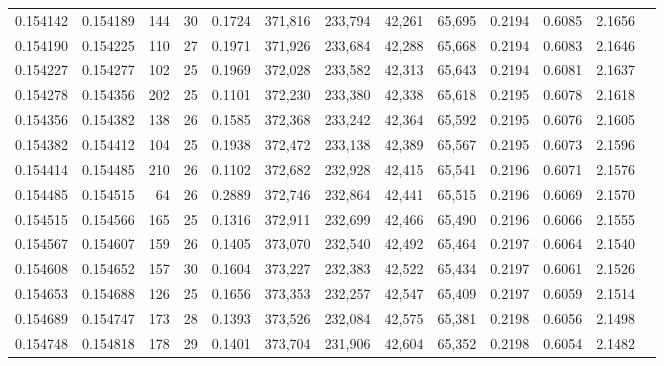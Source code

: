 \begin{tabular}{rrrrrrrrrrrrr}
0.154142 & 0.154189 & 144 &  30 &                                     0.1724 & 371,816 & 233,794 &  42,261 &  65,695 & 0.2194 & 0.6085 & 2.1656 \\
0.154190 & 0.154225 & 110 &  27 &                                     0.1971 & 371,926 & 233,684 &  42,288 &  65,668 & 0.2194 & 0.6083 & 2.1646 \\
0.154227 & 0.154277 & 102 &  25 &                                     0.1969 & 372,028 & 233,582 &  42,313 &  65,643 & 0.2194 & 0.6081 & 2.1637 \\
0.154278 & 0.154356 & 202 &  25 &                                     0.1101 & 372,230 & 233,380 &  42,338 &  65,618 & 0.2195 & 0.6078 & 2.1618 \\
0.154356 & 0.154382 & 138 &  26 &                                     0.1585 & 372,368 & 233,242 &  42,364 &  65,592 & 0.2195 & 0.6076 & 2.1605 \\
0.154382 & 0.154412 & 104 &  25 &                                     0.1938 & 372,472 & 233,138 &  42,389 &  65,567 & 0.2195 & 0.6073 & 2.1596 \\
0.154414 & 0.154485 & 210 &  26 &                                     0.1102 & 372,682 & 232,928 &  42,415 &  65,541 & 0.2196 & 0.6071 & 2.1576 \\
0.154485 & 0.154515 &  64 &  26 &                                     0.2889 & 372,746 & 232,864 &  42,441 &  65,515 & 0.2196 & 0.6069 & 2.1570 \\
0.154515 & 0.154566 & 165 &  25 &                                     0.1316 & 372,911 & 232,699 &  42,466 &  65,490 & 0.2196 & 0.6066 & 2.1555 \\
0.154567 & 0.154607 & 159 &  26 &                                     0.1405 & 373,070 & 232,540 &  42,492 &  65,464 & 0.2197 & 0.6064 & 2.1540 \\
0.154608 & 0.154652 & 157 &  30 &                                     0.1604 & 373,227 & 232,383 &  42,522 &  65,434 & 0.2197 & 0.6061 & 2.1526 \\
0.154653 & 0.154688 & 126 &  25 &                                     0.1656 & 373,353 & 232,257 &  42,547 &  65,409 & 0.2197 & 0.6059 & 2.1514 \\
0.154689 & 0.154747 & 173 &  28 &                                     0.1393 & 373,526 & 232,084 &  42,575 &  65,381 & 0.2198 & 0.6056 & 2.1498 \\
0.154748 & 0.154818 & 178 &  29 &                                     0.1401 & 373,704 & 231,906 &  42,604 &  65,352 & 0.2198 & 0.6054 & 2.1482 \\

\end{tabular}
